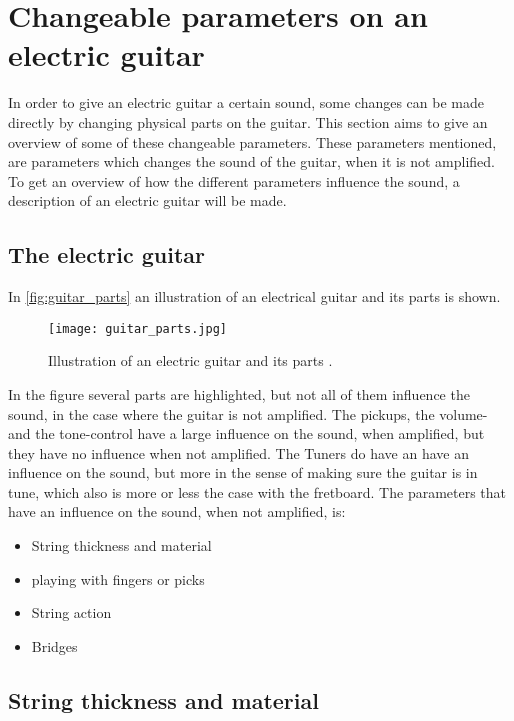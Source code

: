 \section{Changeable parameters on an electric guitar}

In order to give an electric guitar a certain sound, some changes can be made directly by changing physical parts on the guitar. This section aims to give an overview of some of these changeable parameters. These parameters mentioned, are parameters which changes the sound of the guitar, when it is not amplified.
To get an overview of how the different parameters influence the sound, a description of an electric guitar will be made.

\subsection{The electric guitar}

In \autoref{fig:guitar_parts} an illustration of an electrical guitar and its parts is shown.

\begin{figure}[h]
	\centering
		\texttt{[image: guitar\_parts.jpg]}
		\caption{Illustration of an electric guitar and its parts \cite{coustii}.}
		\label{fig:guitar_parts}
\end{figure}

In the figure several parts are highlighted, but not all of them influence the sound, in the case where the guitar is not amplified. The pickups, the volume- and the tone-control have a large influence on the sound, when amplified, but they have no influence when not amplified. The Tuners do have an have an influence on the sound, but more in the sense of making sure the guitar is in tune, which also is more or less the case with the fretboard. 
The parameters that have an influence on the sound, when not amplified, is:

\begin{itemize}
 \item String thickness and material
 \item playing with fingers or picks
 \item String action
 \item Bridges
\end{itemize}

\subsection{String thickness and material}




